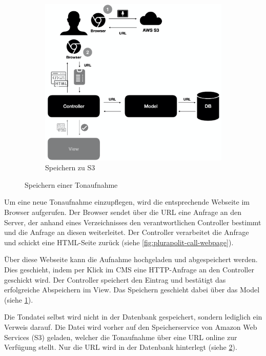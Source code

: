 \begin{figure}
\begin{subfigure}[a]{0.4\linewidth}
		\label{fig:plurapolit-save-sounddatei}
	\end{subfigure}
	\begin{subfigure}[b]{0.4\linewidth}
		\includegraphics[width=\linewidth]{Assets/PluraPolit-Softwaresystem.003}
		\caption{Speichern zu S3}
		\label{fig:plurapolit-save-to-s3}
	\end{subfigure}
	\caption{Speichern einer Tonaufnahme}
	\label{fig:coffee}
\end{figure}

Um eine neue Tonaufnahme einzupflegen, wird die entsprechende Webseite im Browser aufgerufen. Der Browser sendet über die URL eine Anfrage an den Server, der anhand eines Verzeichnisses den verantwortlichen Controller bestimmt und die Anfrage an diesen weiterleitet.  Der Controller verarbeitet die Anfrage und schickt eine HTML-Seite zurück (siehe \cref{fig:plurapolit-call-webpage}).

Über diese Webseite kann die Aufnahme hochgeladen und abgespeichert werden. 
Dies geschieht, indem per Klick im CMS eine HTTP-Anfrage an den Controller geschickt wird. Der Controller speichert den Eintrag und bestätigt das erfolgreiche Abspeichern im View. Das Speichern geschieht dabei über das Model (siehe \cref{fig:plurapolit-save-sounddatei}).

Die Tondatei selbst wird nicht in der Datenbank gespeichert, sondern lediglich ein Verweis darauf. 
Die Datei wird vorher auf den Speicherservice von Amazon Web Services (S3) geladen, welcher die Tonaufnahme über eine URL online zur Verfügung stellt. Nur die URL wird in der Datenbank hinterlegt (siehe \cref{fig:plurapolit-save-to-s3}).

